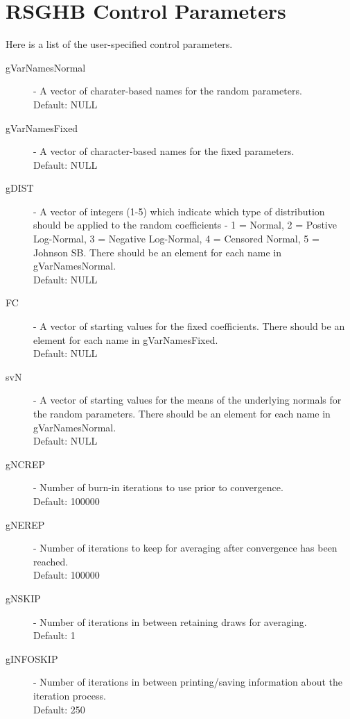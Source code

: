 \documentclass{article}
\begin{document}
\section*{RSGHB Control Parameters}

Here is a list of the user-specified control parameters.


\begin{description}

\item[gVarNamesNormal] - A vector of charater-based names for the random parameters. \\
Default: NULL

\item[gVarNamesFixed] - A vector of character-based names for the fixed parameters.\\
Default: NULL

\item[gDIST] - A vector of integers (1-5) which indicate which type of distribution should be applied to the random coefficients - 1 = Normal, 2 = Postive Log-Normal, 3 = Negative Log-Normal, 4 = Censored Normal, 5 = Johnson SB. There should be an element for each name in gVarNamesNormal. \\ Default: NULL

\item[FC] - A vector of starting values for the fixed coefficients. There should be an element for each name in gVarNamesFixed.\\ 
Default: NULL

\item[svN] - A vector of starting values for the means of the underlying normals for the random parameters. There should be an element for each name in gVarNamesNormal.\\ Default: NULL

\item[gNCREP] - Number of burn-in iterations to use prior to convergence.\\ 
Default: 100000

\item[gNEREP] - Number of iterations to keep for averaging after convergence has been reached.\\ Default: 100000

\item[gNSKIP] - Number of iterations in between retaining draws for averaging.\\ 
Default: 1

\item[gINFOSKIP] - Number of iterations in between printing/saving information about the iteration process.
\\ Default: 250


\end{description}
\end{document}

